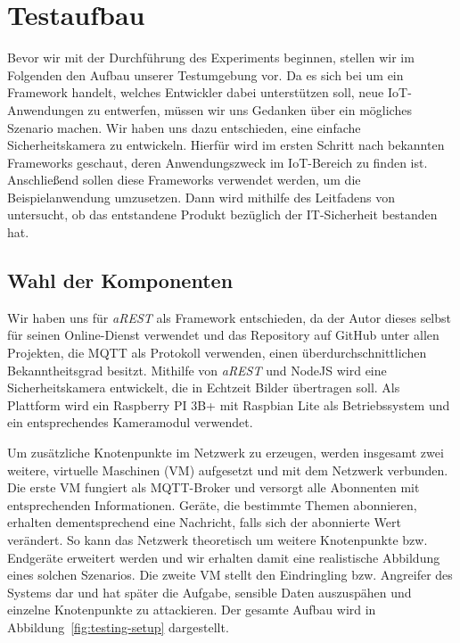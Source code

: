 \newpage
\section{Testaufbau}
Bevor wir mit der Durchführung des Experiments beginnen, stellen wir im
Folgenden den Aufbau unserer Testumgebung vor. Da es sich bei \cite{paper} um
ein Framework handelt, welches Entwickler dabei unterstützen soll, neue
IoT-Anwendungen zu entwerfen, müssen wir uns Gedanken über ein mögliches
Szenario machen. Wir haben uns dazu entschieden, eine einfache Sicherheitskamera
zu entwickeln. Hierfür wird im ersten Schritt nach bekannten Frameworks
geschaut, deren Anwendungszweck im IoT-Bereich zu finden ist. Anschließend
sollen diese Frameworks verwendet werden, um die Beispielanwendung umzusetzen.
Dann wird mithilfe des Leitfadens von \cite{paper} untersucht, ob das
entstandene Produkt bezüglich der IT-Sicherheit bestanden hat.

\subsection{Wahl der Komponenten}

Wir haben uns für \textit{aREST} als Framework entschieden, da der Autor dieses
selbst für seinen Online-Dienst verwendet und das Repository auf GitHub unter
allen Projekten, die MQTT als Protokoll verwenden, einen über\-durch\-schnittlichen
Bekanntheitsgrad besitzt. Mithilfe von \textit{aREST} und NodeJS wird eine
Sicherheitskamera entwickelt, die in Echtzeit Bilder übertragen soll. Als
Plattform wird ein Raspberry PI 3B+ mit Raspbian Lite als Betriebssystem und ein
entsprechendes Kameramodul verwendet.

Um zusätzliche Knotenpunkte im Netzwerk zu erzeugen, werden insgesamt zwei
weitere, virtuelle Maschinen (VM) aufgesetzt und mit dem Netzwerk verbunden. Die
erste VM fungiert als MQTT-Broker und versorgt alle Abonnenten mit entsprechenden
Informationen. Geräte, die bestimmte Themen abonnieren, erhalten dementsprechend
eine Nachricht, falls sich der abonnierte Wert verändert. So kann das Netzwerk
theoretisch um weitere Knotenpunkte bzw. Endgeräte erweitert werden und wir
erhalten damit eine realistische Abbildung eines solchen Szenarios. Die zweite
VM stellt den Eindringling bzw. Angreifer des Systems dar und hat später die
Aufgabe, sensible Daten auszuspähen und einzelne Knotenpunkte zu attackieren.
Der gesamte Aufbau wird in Abbildung~\ref{fig:testing-setup} dargestellt.

